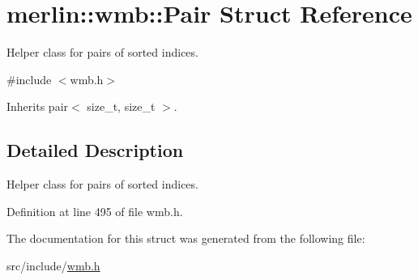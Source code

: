 \hypertarget{structmerlin_1_1wmb_1_1Pair}{}\section{merlin\+:\+:wmb\+:\+:Pair Struct Reference}
\label{structmerlin_1_1wmb_1_1Pair}


Helper class for pairs of sorted indices.  




{\ttfamily \#include $<$wmb.\+h$>$}



Inherits pair$<$ size\+\_\+t, size\+\_\+t $>$.



\subsection{Detailed Description}
Helper class for pairs of sorted indices. 

Definition at line 495 of file wmb.\+h.



The documentation for this struct was generated from the following file\+:\begin{DoxyCompactItemize}
\item 
src/include/\hyperlink{wmb_8h}{wmb.\+h}\end{DoxyCompactItemize}
